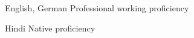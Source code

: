 
\begin{cventries}

  \cventry
    {English, German} %
    {Professional working proficiency}
    {}
    {}
    {}

  \cventry
    {Hindi} %
    {Native proficiency}
    {}
    {}
    {}
    
\end{cventries}
